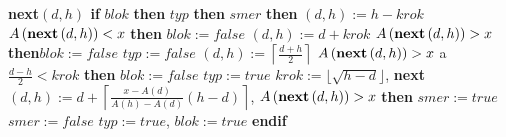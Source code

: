 {\bf next$\left(d,h\right)$\newline 
if} $blok$ {\bf then}\newline 
\phantom{---}{\bf if} $typ$ {\bf then}\newline 
\phantom{------}{\bf if} $smer$ {\bf then}\newline 
\phantom{---------}{\bf next}$\left(d,h\right):=h-krok$\newline 
\phantom{---------}{\bf if} $A\left(\text{{\bf next}}\left(d,h\right)\right)<x$ {\bf then}\newline
\phantom{------------}$blok:=false$\newline 
\phantom{---------}{\bf endif}\newline 
\phantom{------}{\bf else}\newline 
\phantom{---------}{\bf next}$\left(d,h\right):=d+krok$\newline 
\phantom{---------}{\bf if} $A\left(\text{{\bf next}}\left(d,h\right)\right)>x$ {\bf then}\newline \phantom{------------}$blok:=false$\newline 
\phantom{---------}{\bf endif}\newline 
\phantom{------}{\bf endif}\newline 
\phantom{------}$typ:=false$\newline 
\phantom{---}{\bf else}\newline 
\phantom{------}{\bf next}$\left(d,h\right):=\left\lceil\frac {d+h}2\right\rceil$\newline
\phantom{------}{\bf if} $A\left(\text{{\bf next}}\left(d,h\right)\right)>x$ a $\frac{d-h}2<krok$ {\bf then}\newline
\phantom{---------}$blok:=false$\newline 
\phantom{------}{\bf else}\newline
\phantom{---------}$typ:=true$\newline 
\phantom{------}{\bf endif}\newline 
\phantom{---}{\bf endif\newline 
else}\newline 
\phantom{---}$krok:=\lfloor\sqrt {h-d}\rfloor$, 
{\bf next$\left(d,h\right):=d+\left\lceil\frac {x-A\left(d\right)}{A\left(h\right)-A\left(d\right)}\left(h-d\right)\right\rceil$},\newline 
\phantom{---}{\bf if} $A\left(\text{{\bf next}}\left(d,h\right)\right)>x$ {\bf then}\newline 
\phantom{------}$smer:=true$\newline 
\phantom{---}{\bf else}\newline 
\phantom{------}$smer:=false$\newline 
\phantom{---}{\bf endif}\newline 
\phantom{---}$typ:=true$, $blok:=true$\newline 
{\bf endif}
\bigskip

